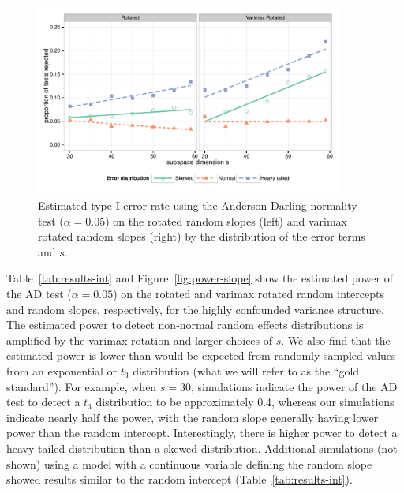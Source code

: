 \documentclass[12pt]{article} %
\newcommand{\hh}[1]{{\color{orange} #1}}
\newcommand{\al}[1]{{\color{red} #1}}
\begin{document}
\begin{figure}[h]
	\centering
	\includegraphics[width=0.9\textwidth]{ad_slope_results.pdf}
	\caption{\label{fig:results-slope} Estimated type I error rate using the Anderson-Darling normality test ($\alpha = 0.05$) on the rotated random slopes (left) and varimax rotated random slopes (right) by the distribution of the error terms and $s$.}
\end{figure}

Table~\ref{tab:results-int} and Figure~\ref{fig:power-slope} show the estimated power of the AD test ($\alpha = 0.05$) on the rotated and varimax rotated random intercepts and random slopes, respectively, for the highly confounded variance structure. The estimated power to detect non-normal random effects distributions is amplified by the varimax rotation and larger choices of $s$. We also find that the estimated power is lower than would be expected from randomly sampled values from an exponential or $t_3$ distribution (what we will refer to as the ``gold standard''). 
For example, when $s=30$, simulations indicate the power of the AD test to detect a $t_3$ distribution to be approximately 0.4, whereas our simulations indicate nearly half the power, with the random slope generally having lower power than the random intercept. Interestingly,  there is higher power to detect a heavy tailed distribution than a skewed distribution.  Additional simulations (not shown) using a model with a continuous variable defining the random slope showed results similar to the random intercept (Table~\ref{tab:results-int}).
\end{document}
